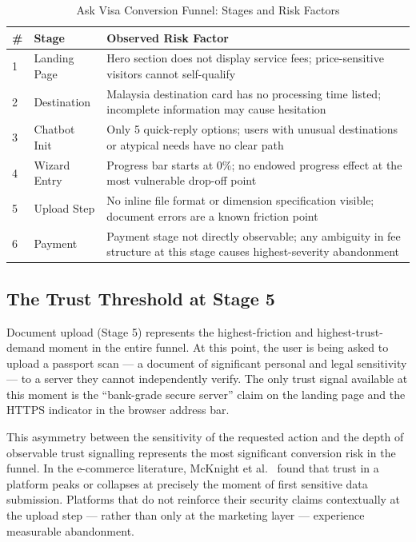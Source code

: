 \documentclass[journal, 10pt, twoside]{IEEEtran}
\begin{document}
\begin{table}[ht]
  \centering
  \caption{Ask Visa Conversion Funnel: Stages and Risk Factors}
  \label{tab:funnel}
  \begin{tabular}{@{}p{0.3cm} p{2.0cm} p{4.8cm}@{}}
    \toprule
    \textbf{\#} & \textbf{Stage} & \textbf{Observed Risk Factor} \\
    \midrule
    1 & Landing Page & Hero section does not display service fees;
                       price-sensitive visitors cannot self-qualify \\
    2 & Destination  & Malaysia destination card has no processing
                       time listed; incomplete information may cause
                       hesitation \\
    3 & Chatbot Init & Only 5 quick-reply options; users with unusual
                       destinations or atypical needs have no clear path \\
    4 & Wizard Entry & Progress bar starts at 0\%; no endowed progress
                       effect at the most vulnerable drop-off point \\
    5 & Upload Step  & No inline file format or dimension specification
                       visible; document errors are a known friction point \\
    6 & Payment      & Payment stage not directly observable; any
                       ambiguity in fee structure at this stage causes
                       highest-severity abandonment \\
    \bottomrule
  \end{tabular}
\end{table}

\subsection{The Trust Threshold at Stage 5}
Document upload (Stage 5) represents the highest-friction and
highest-trust-demand moment in the entire funnel. At this point, the user
is being asked to upload a passport scan --- a document of significant
personal and legal sensitivity --- to a server they cannot independently
verify. The only trust signal available at this moment is the ``bank-grade
secure server'' claim on the landing page and the HTTPS indicator in the
browser address bar.

This asymmetry between the sensitivity of the requested action and the
depth of observable trust signalling represents the most significant
conversion risk in the funnel. In the e-commerce literature, McKnight et al.\
\cite{mcknight2002} found that trust in a platform peaks or collapses
at precisely the moment of first sensitive data submission. Platforms that
do not reinforce their security claims contextually at the upload step ---
rather than only at the marketing layer --- experience measurable abandonment.
\end{document}
